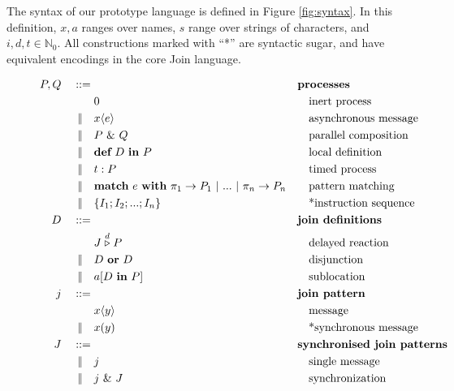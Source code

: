 The syntax of our prototype language is defined in Figure \ref{fig:syntax}. In
this definition, $x,a$ ranges over names, $s$ range over strings of characters,
and $i,d,t \in \mathbb{N}_0$. All constructions marked with ``*'' are syntactic
sugar, and have equivalent encodings in the core Join language.

\begin{figure}
\begin{align*}
P,Q\quad::={}&             && \textbf{processes} \\
          & 0              && \quad\textrm{inert process} \\
 \alt\quad& x\langle e \rangle
                           && \quad\textrm{asynchronous message} \\
 \alt\quad& P~\&~Q         && \quad\textrm{parallel composition} \\
 \alt\quad& \textbf{def}~D~\textbf{in}~P
                           && \quad\textrm{local definition} \\
 \alt\quad& t : P          && \quad\textrm{timed process} \\
 \alt\quad& \textbf{match}~e~\textbf{with}~\pi_1
               \rightarrow P_1 ~|~ ... ~|~ \pi_n \rightarrow P_n
                           && \quad\textrm{pattern matching} \\
 \alt\quad& \{ I_1; I_2; ...; I_n \}
                           && \quad\textrm{*instruction sequence} \\
D\quad ::={}&              && \textbf{join definitions} \\
         & J \stackrel{d}{\triangleright} P
                           && \quad\textrm{delayed reaction} \\
\alt\quad& D~\textbf{or}~D && \quad\textrm{disjunction} \\
\alt\quad& a[D~\textbf{in}~P] && \quad\textrm{sublocation} \\
j\quad ::={}&             && \textbf{join pattern} \\
            & x\langle y \rangle
                           && \quad\textrm{message} \\
\alt\quad& x(y)
                           && \quad\textrm{*synchronous message} \\
J\quad ::={}&              && \textbf{synchronised join patterns}\\
\alt\quad& j               && \quad\textrm{single message}\\
\alt\quad& j ~\&~ J
                           && \quad\textrm{synchronization} \\

\end{align*}
\end{figure}
